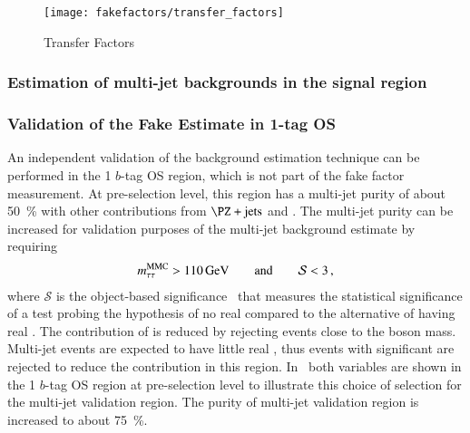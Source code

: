 \begin{figure}[htbp]
  \centering

  \texttt{[image: fakefactors/transfer\_factors]}

  \caption{Transfer Factors}
  \label{fig:mjfakes_transfer_factor}
\end{figure}


\subsubsection{Estimation of multi-jet backgrounds in the signal region}


\subsubsection{Validation of the Fake Estimate in 1-tag OS}

An independent validation of the background estimation technique can
be performed in the 1 $b$-tag OS region, which is not part of the fake
factor measurement. At pre-selection level, this region has a
multi-jet purity of about \SI{50}{\percent} with other contributions
from $\Zjets$ and \ttbar. The multi-jet purity can be increased for
validation purposes of the multi-jet background estimate by requiring
\begin{align*}
  m_{\tau\tau}^\text{MMC} > \SI{110}{\ensuremath{\text{GeV}}} \qquad \text{and} \qquad \mathcal{S} < 3 \,\text{,}
\end{align*}
where $\mathcal{S}$ is the object-based \pTmissAbs
significance~\cite{ATLAS-CONF-2018-038} that measures the statistical
significance of a test probing the hypothesis of no real \pTmissAbs
compared to the alternative of having real \pTmissAbs. The
contribution of \Zjets is reduced by rejecting events close to the \PZ
boson mass. Multi-jet events are expected to have little real
\pTmissAbs, thus events with significant \pTmissAbs are rejected to
reduce the \ttbar contribution in this
region. In~ both variables are
shown in the 1 $b$-tag OS region at pre-selection level to illustrate
this choice of selection for the multi-jet validation region. The
purity of multi-jet validation region is increased to about
\SI{75}{\percent}.

